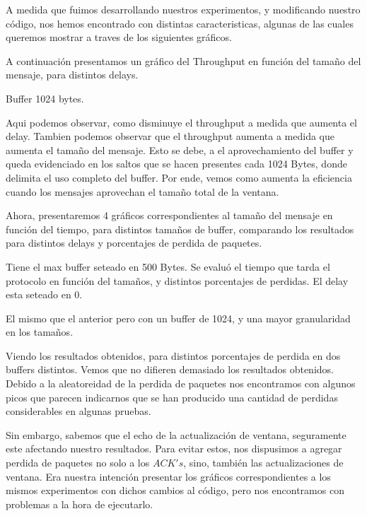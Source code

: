 A medida que fuimos desarrollando nuestros experimentos, y modificando nuestro c\'odigo, nos hemos encontrado con distintas caracteristicas, algunas de las cuales queremos mostrar a traves de los siguientes gr\'aficos.

A continuaci\'on presentamos un gr\'afico del Throughput en funci\'on del tama\~no del mensaje, para distintos delays.

Buffer 1024 bytes.

Aqui podemos observar, como disminuye el throughput a medida que aumenta el delay. Tambien podemos observar que el throughput aumenta a medida que aumenta el tama\~no del mensaje. Esto se debe, a el aprovechamiento del buffer y queda evidenciado en los saltos que se hacen presentes cada 1024 Bytes, donde delimita el uso completo del buffer.
Por ende, vemos como aumenta la eficiencia cuando los mensajes aprovechan el tama\~no total de la ventana.


Ahora, presentaremos 4 gr\'aficos correspondientes al tama\~no del mensaje en funci\'on del tiempo, para distintos tama\~nos de buffer, comparando los resultados para distintos delays y porcentajes de perdida de paquetes.

Tiene el max buffer seteado en 500 Bytes. Se evalu\'o el tiempo que tarda el protocolo en funci\'on del tama\~nos, y distintos porcentajes de perdidas. El delay esta seteado en 0. 

El mismo que el anterior pero con un buffer de 1024, y una mayor granularidad en los tama\~nos.

Viendo los resultados obtenidos, para distintos porcentajes de perdida en dos buffers distintos. Vemos que no difieren demasiado los resultados obtenidos. Debido a la aleatoreidad de la perdida de paquetes nos encontramos con algunos picos que parecen indicarnos que se han producido una cantidad de perdidas considerables en algunas pruebas. 

Sin embargo, sabemos que el echo de la actualizaci\'on de ventana, seguramente este afectando nuestro resultados. Para evitar estos, nos dispusimos a agregar perdida de paquetes no solo a los $ACK's$, sino, tambi\'en las actualizaciones de ventana.
Era nuestra intenci\'on presentar los gr\'aficos correspondientes a los mismos experimentos con dichos cambios al c\'odigo, pero nos encontramos con problemas a la hora de ejecutarlo.


